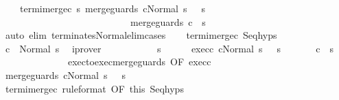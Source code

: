 \begin{isabellebody}
\ \ \ \ termi{\isacharunderscore}merge{\isacharunderscore}c{}{\isacharcolon}\ {\isachardoublequoteopen}{\isasymforall}s{\isacharprime}{\isachardot}\ {\isasymGamma}{\isasymturnstile}{\isasymlangle}merge{\isacharunderscore}guards\ c{}{\isacharcomma}Normal\ s\ {\isasymrangle}\ {\isasymRightarrow}\ s{\isacharprime}\ {\isasymlongrightarrow}\ \isanewline
\ \ \ \ \ \ \ \ \ \ \ \ \ \ \ \ \ \ \ \ \ \ \ \ \ \ \ {\isasymGamma}{\isasymturnstile}merge{\isacharunderscore}guards\ c{}\ {\isasymdown}\ s{\isacharprime}{\isachardoublequoteclose}\isanewline
\ \ \ \ \isamarkupfalse%
\ {\isacharparenleft}auto\ elim{\isacharcolon}\ terminates{\isacharunderscore}Normal{\isacharunderscore}elim{\isacharunderscore}cases{\isacharparenright}\isanewline
\ \ \isamarkupfalse%
\ termi{\isacharunderscore}merge{\isacharunderscore}c{}\ Seq{\isachardot}hyps\isanewline
\ \ \isamarkupfalse%
\ {\isachardoublequoteopen}{\isasymGamma}{\isasymturnstile}c{}\ {\isasymdown}\ Normal\ s{\isachardoublequoteclose}\ \isamarkupfalse%
\ iprover\isanewline
\ \ \isamarkupfalse%
\isanewline
\ \ \isacommand{{\isacharbraceleft}}\isamarkupfalse%
\isanewline
\ \ \ \ \isamarkupfalse%
\ s{\isacharprime}\isanewline
\ \ \ \ \isamarkupfalse%
\ exec{\isacharunderscore}c{}{\isacharcolon}\ {\isachardoublequoteopen}{\isasymGamma}{\isasymturnstile}{\isasymlangle}c{}{\isacharcomma}Normal\ s\ {\isasymrangle}\ {\isasymRightarrow}\ s{\isacharprime}{\isachardoublequoteclose}\isanewline
\ \ \ \ \isamarkupfalse%
\ {\isachardoublequoteopen}{\isasymGamma}{\isasymturnstile}\ c{}\ {\isasymdown}\ s{\isacharprime}{\isachardoublequoteclose}\isanewline
\ \ \ \ \isamarkupfalse%
\ {\isacharminus}\isanewline
\ \ \ \ \ \ \isamarkupfalse%
\ exec{\isacharunderscore}to{\isacharunderscore}exec{\isacharunderscore}merge{\isacharunderscore}guards\ {\isacharbrackleft}OF\ exec{\isacharunderscore}c{}{\isacharbrackright}\ \isanewline
\ \ \ \ \ \ \isamarkupfalse%
\ {\isachardoublequoteopen}{\isasymGamma}{\isasymturnstile}{\isasymlangle}merge{\isacharunderscore}guards\ c{}{\isacharcomma}Normal\ s\ {\isasymrangle}\ {\isasymRightarrow}\ s{\isacharprime}{\isachardoublequoteclose}\ \isacommand{{\isachardot}}\isamarkupfalse%
\isanewline
\ \ \ \ \ \ \isamarkupfalse%
\ termi{\isacharunderscore}merge{\isacharunderscore}c{}\ {\isacharbrackleft}rule{\isacharunderscore}format{\isacharcomma}\ OF\ this{\isacharbrackright}\ Seq{\isachardot}hyps\isanewline

\end{isabellebody}
